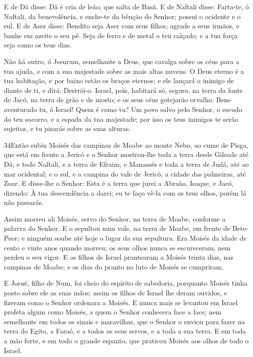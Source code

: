 E de Dã disse: Dã é cria de leão; que salta de Basã. E de
Naftali disse: Farta-te, ó Naftali, da benevolência, e enche-te da
bênção do Senhor; possui o ocidente e o sul. E de Aser disse:
Bendito seja Aser com seus filhos; agrade a seus irmãos, e banhe em
azeite o seu pé. Seja de ferro e de metal o teu calçado; e a
tua força seja como os teus dias.

Não há outro, ó Jesurum, semelhante a Deus, que cavalga sobre os
céus para a tua ajuda, e com a sua majestade sobre as mais altas
nuvens. O Deus eterno é a tua habitação, e por baixo estão os
braços eternos; e ele lançará o inimigo de diante de ti, e dirá:
Destrói-o. Israel, pois, habitará só, seguro, na terra da
fonte de Jacó, na terra de grão e de mosto; e os seus céus gotejarão
orvalho. Bem-aventurado tu, ó Israel! Quem é como tu? Um povo
salvo pelo Senhor, o escudo do teu socorro, e a espada da tua
majestade; por isso os teus inimigos te serão sujeitos, e tu pisarás
sobre as suas alturas.

\medskip

\lettrine{34} Então subiu Moisés das campinas de Moabe ao
monte Nebo, ao cume de Pisga, que está em frente a Jericó e o Senhor
mostrou-lhe toda a terra desde Gileade até Dã; e todo Naftali, e
a terra de Efraim, e Manassés e toda a terra de Judá, até ao mar
ocidental; e o sul, e a campina do vale de Jericó, a cidade das
palmeiras, até Zoar. E disse-lhe o Senhor: Esta é a terra que
jurei a Abraão, Isaque, e Jacó, dizendo: À tua descendência a darei;
eu te faço vê-la com os teus olhos, porém lá não passarás.

Assim morreu ali Moisés, servo do Senhor, na terra de Moabe,
conforme a palavra do Senhor. E o sepultou num vale, na terra de
Moabe, em frente de Bete-Peor; e ninguém soube até hoje o lugar da
sua sepultura. Era Moisés da idade de cento e vinte anos quando
morreu; os seus olhos nunca se escureceram, nem perdeu o seu vigor.
E os filhos de Israel prantearam a Moisés trinta dias, nas
campinas de Moabe; e os dias do pranto no luto de Moisés se
cumpriram.

E Josué, filho de Num, foi cheio do espírito de sabedoria,
porquanto Moisés tinha posto sobre ele as suas mãos; assim os filhos
de Israel lhe deram ouvidos, e fizeram como o Senhor ordenara a
Moisés. E nunca mais se levantou em Israel profeta algum como
Moisés, a quem o Senhor conhecera face a face; nem semelhante
em todos os sinais e maravilhas, que o Senhor o enviou para fazer na
terra do Egito, a Faraó, e a todos os seus servos, e a toda a sua
terra. E em toda a mão forte, e em todo o grande espanto, que
praticou Moisés aos olhos de todo o Israel.

